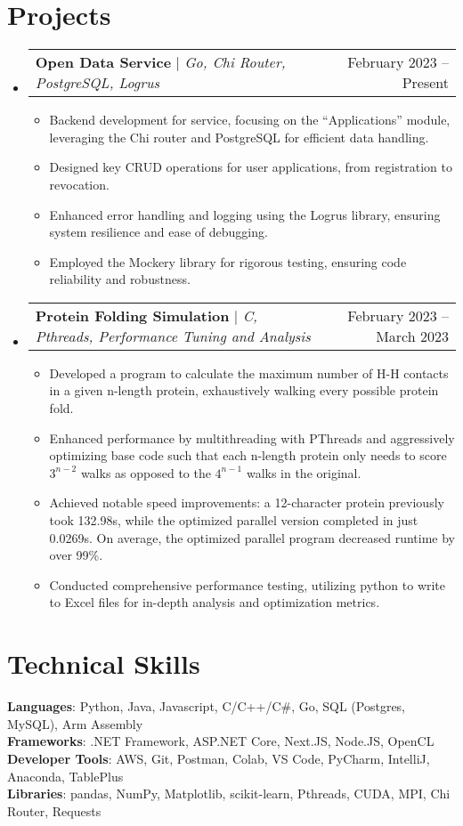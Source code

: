 \documentclass[letterpaper,11pt]{article}
\makeatletter
\newcommand{\resumeItem}[1]{
  \item\small{
    {#1 \vspace{-2pt}}
  }
}
\newcommand{\resumeProjectHeading}[2]{
    \item
    \begin{tabular*}{0.97\textwidth}{l@{\extracolsep{\fill}}r}
      \small#1 & #2 \\
    \end{tabular*}\vspace{-7pt}
}
\newcommand{\resumeSubHeadingListStart}{\begin{itemize}[leftmargin=0.15in, label={}]}
\newcommand{\resumeSubHeadingListEnd}{\end{itemize}}
\newcommand{\resumeItemListStart}{\begin{itemize}}
\newcommand{\resumeItemListEnd}{\end{itemize}\vspace{-5pt}}
\makeatother
\begin{document}
\section{Projects}
    \resumeSubHeadingListStart
      \resumeProjectHeading
          {\textbf{Open Data Service} $|$ \emph{Go, Chi Router, PostgreSQL, Logrus}}{February 2023 -- Present}
          \resumeItemListStart
            \resumeItem{Backend development for service, focusing on the ``Applications'' module, leveraging the Chi router and PostgreSQL for efficient data handling.}
            \resumeItem{Designed key CRUD operations for user applications, from registration to revocation.}
            \resumeItem{Enhanced error handling and logging using the Logrus library, ensuring system resilience and ease of debugging.}
            \resumeItem{Employed the Mockery library for rigorous testing, ensuring code reliability and robustness.}
          \resumeItemListEnd
      \resumeProjectHeading
          {\textbf{Protein Folding Simulation} $|$ \emph{C, Pthreads, Performance Tuning and Analysis}}{February 2023 -- March 2023}
          \resumeItemListStart
            \resumeItem{Developed a program to calculate the maximum number of H-H contacts in a given n-length protein, exhaustively walking every possible protein fold.}
            \resumeItem{Enhanced performance by multithreading with PThreads and aggressively optimizing base code such that each n-length protein only needs to score $3^{n-2}$ walks as opposed to the $4^{n-1}$ walks in the original.}
            \resumeItem{Achieved notable speed improvements: a 12-character protein previously took 132.98s, while the optimized parallel version completed in just 0.0269s. On average, the optimized parallel program decreased runtime by over 99\%.}
            \resumeItem{Conducted comprehensive performance testing, utilizing python to write to Excel files for in-depth analysis and optimization metrics.}
          \resumeItemListEnd
    \resumeSubHeadingListEnd



%
\section{Technical Skills}
 \begin{itemize}[leftmargin=0.15in, label={}]
    \small{\item{
     \textbf{Languages}{: Python, Java, Javascript, C/C++/C\#, Go, SQL (Postgres, MySQL), Arm Assembly} \\
     \textbf{Frameworks}{: .NET Framework, ASP.NET Core, Next.JS, Node.JS, OpenCL} \\
     \textbf{Developer Tools}{: AWS, Git, Postman, Colab, VS Code, PyCharm, IntelliJ, Anaconda, TablePlus} \\
     \textbf{Libraries}{: pandas, NumPy, Matplotlib, scikit-learn, Pthreads, CUDA, MPI, Chi Router, Requests}
    }}
 \end{itemize}


\end{document}
